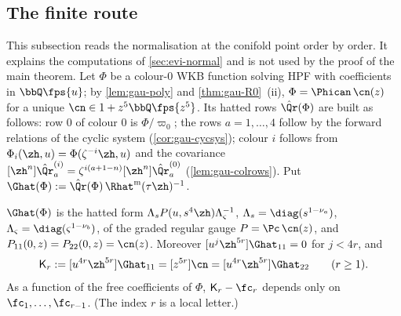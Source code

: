 \subsection{The finite route}
\label{sec:con-finite}

This subsection reads the normalisation at the conifold point order by order. It explains the computations of \cref{sec:evi-normal} and is not used by the proof of the main theorem. Let $\Phi$ be a colour-$0$ WKB function solving HPF with coefficients in $\bbQ\fps{u}$; by \cref{lem:gau-poly} and \cref{thm:gau-R0}~(ii), $\Phi=\Phican\,\cn(z)$ for a unique $\cn\in1+z^5\bbQ\fps{z^5}$. Its hatted rows $\hat\Qr(\Phi)$ are built as follows: row $0$ of colour $0$ is $\Phi/\varpi_0$; the rows $a=1,\dots,4$ follow by the forward relations of the cyclic system (\cref{cor:gau-cycsys}); colour $i$ follows from $\Phi_i(\zh,u)=\Phi(\zeta^{-i}\zh,u)$ and the covariance $[\zh^n]\hat\Qr^{(i)}_a=\zeta^{i(a+1-n)}[\zh^n]\hat\Qr^{(0)}_a$ (\cref{lem:gau-colrows}). Put $\Ghat(\Phi):=\hat\Qr(\Phi)\,\Rhat^{\mathrm m}(\tau\zh)^{-1}$.

\begin{lem}
\label{lem:con-N}
$\Ghat(\Phi)$ is the hatted form $\Lambda_sP(u,s^4\zh)\Lambda_\varsigma^{-1}$, $\Lambda_s=\diag(s^{1-\nu_a})$, $\Lambda_\varsigma=\diag(\varsigma^{1-\nu_b})$, of the graded regular gauge $P=\Pc\,\cn(z)$, and $P_{11}(0,z)=P_{22}(0,z)=\cn(z)$. Moreover $[u^j\zh^{5r}]\Ghat_{11}=0$ for $j<4r$, and
\[
\mathsf K_r:=[u^{4r}\zh^{5r}]\Ghat_{11}=[z^{5r}]\cn=[u^{4r}\zh^{5r}]\Ghat_{22}\qquad(r\geq1).
\]
As a function of the free coefficients of $\Phi$, $\mathsf K_r-\fc_r$ depends only on $\fc_1,\dots,\fc_{r-1}$. (The index $r$ is a local letter.)
\end{lem}

